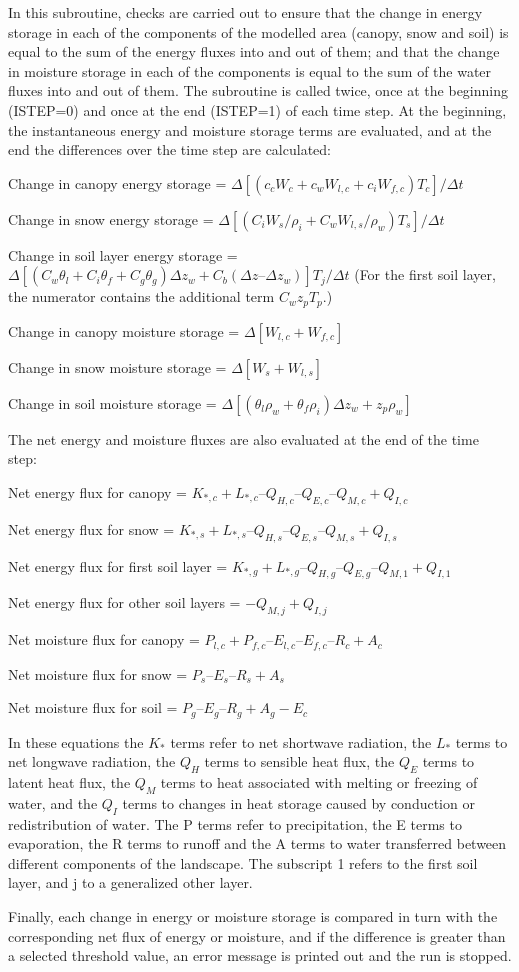 In this subroutine, checks are carried out to ensure that the change in energy storage in each of the components of the modelled area (canopy, snow and soil) is equal to the sum of the energy fluxes into and out of them; and that the change in moisture storage in each of the components is equal to the sum of the water fluxes into and out of them. The subroutine is called twice, once at the beginning (I\+S\+T\+E\+P=0) and once at the end (I\+S\+T\+E\+P=1) of each time step. At the beginning, the instantaneous energy and moisture storage terms are evaluated, and at the end the differences over the time step are calculated\+:

Change in canopy energy storage = $\Delta [(c_c W_c + c_w W_{l,c} + c_i W_{f,c} )T_c ] / \Delta t$

Change in snow energy storage = $\Delta [(C_i W_s /\rho_i + C_w W_{l,s} / \rho_w )T_s ]/ \Delta t $

Change in soil layer energy storage = $\Delta {[(C_w \theta_l + C_i \theta_f + C_g \theta_g ) \Delta z_w + C_b (\Delta z – \Delta z_w )]T_j }/ \Delta t$ (For the first soil layer, the numerator contains the additional term $C_w z_p T_p$.)

Change in canopy moisture storage = $\Delta[W_{l,c} + W_{f,c}]$

Change in snow moisture storage = $\Delta[W_s + W_{l,s}]$

Change in soil moisture storage = $\Delta [(\theta_l \rho_w + \theta_f \rho_i ) \Delta z_w + z_p \rho_w ]$

The net energy and moisture fluxes are also evaluated at the end of the time step\+:

Net energy flux for canopy = $K_{*,c} + L_{*,c} – Q_{H,c} – Q_{E,c} – Q_{M,c} + Q_{I,c}$

Net energy flux for snow = $K_{*,s} + L_{*,s} – Q_{H,s} – Q_{E,s} – Q_{M,s} + Q_{I,s}$

Net energy flux for first soil layer = $K_{*,g} + L_{*,g} – Q_{H,g} – Q_{E,g} – Q_{M,1} + Q_{I,1}$

Net energy flux for other soil layers = $- Q_{M,j} + Q_{I,j}$

Net moisture flux for canopy = $P_{l,c} + P_{f,c} – E_{l,c} – E_{f,c} – R_c + A_c$

Net moisture flux for snow = $P_s – E_s – R_s + A_s$

Net moisture flux for soil = $P_g – E_g – R_g + A_g - E_c$

In these equations the $K_*$ terms refer to net shortwave radiation, the $L_*$ terms to net longwave radiation, the $Q_H$ terms to sensible heat flux, the $Q_E$ terms to latent heat flux, the $Q_M$ terms to heat associated with melting or freezing of water, and the $Q_I$ terms to changes in heat storage caused by conduction or redistribution of water. The P terms refer to precipitation, the E terms to evaporation, the R terms to runoff and the A terms to water transferred between different components of the landscape. The subscript 1 refers to the first soil layer, and j to a generalized other layer.

Finally, each change in energy or moisture storage is compared in turn with the corresponding net flux of energy or moisture, and if the difference is greater than a selected threshold value, an error message is printed out and the run is stopped.